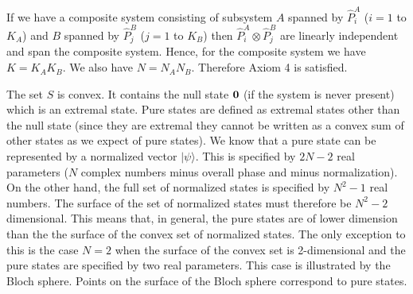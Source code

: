 \documentclass[12pt]{article}
\begin{document}
If we have a composite system consisting of subsystem $A$ spanned by
$\hat{P}^A_i$ ($i=1$ to $K_A$) and $B$ spanned by
$\hat{P}^B_j$ ($j=1$ to $K_B$) then
$\hat{P}_i^A\otimes\hat{P}^B_j$ are linearly independent and span the
composite system.  Hence, for the composite system we have $K=K_AK_B$.
We also have $N=N_AN_B$.  Therefore Axiom 4 is satisfied.

The set $S$ is convex. It contains the null state $\bf 0$ (if the system
is never present) which is an extremal state.  Pure states are
defined as extremal states other than the null state (since they are
extremal they cannot be written as a convex sum of other states as we
expect of pure states).  We know that a  pure state can be represented
by a normalized vector $|\psi\rangle$.  This is specified by $2N-2$ real
parameters ($N$ complex numbers minus overall phase and minus
normalization).  On the other hand, the full set of normalized states is
specified by $N^2-1$ real numbers.  The surface of the set of normalized
states must therefore be $N^2-2$ dimensional.  This means that, in
general, the pure states are of lower dimension than the the surface of
the convex set of normalized states.  The only exception to this is the
case $N=2$ when the surface of the convex set is 2-dimensional and the
pure states are specified by two real parameters.  This case is
illustrated by the Bloch sphere. Points on the surface of the Bloch
sphere correspond to pure states.
\end{document}
